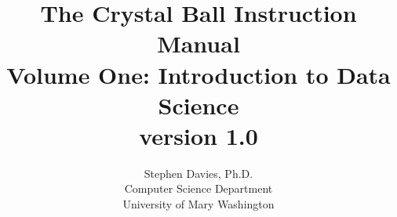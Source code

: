 \documentclass[11pt]{memoir}
\begin{document}
\title{{\huge The Crystal Ball Instruction Manual}\\{\large Volume One: Introduction to
Data Science}\\
{\small version 1.0}}
\author{Stephen Davies, Ph.D.\\Computer Science Department\\University of Mary Washington}
\date{}
\maketitle


\frontmatter

\renewcommand{\contentsname}{Contents}

\setcounter{tocdepth}{0}
\tableofcontents

%

\setcounter{chapter}{0}

\mainmatter






























\begingroup
  \null
  \newpage
\endgroup
\backmatter
\printindex

\shipout\null
\shipout\null
\shipout\null
\shipout\null
\end{document}
